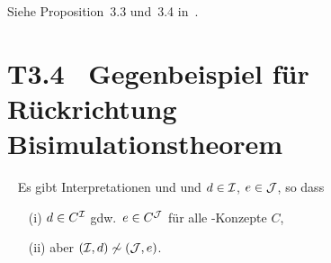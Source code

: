\documentclass[fontsize=11pt, twoside=false, numbers=autoenddot]{scrbook}
\begin{document}
\par\noindent
\begin{beweis}
  Siehe Proposition~3.3 und~3.4 in~\cite{DLintro}.
\end{beweis}

\goodbreak

\section*{T3.4~ Gegenbeispiel für Rückrichtung Bisimulationstheorem}

~
Es gibt Interpretationen \Imc und \Jmc und $d \in \mathcal{I}$, $e \in \mathcal{J}$, so dass
\begin{enumerate}
  \item[(i)]
    $d \in C^\mathcal{I}$ gdw.\ $e \in C^\mathcal{J}$ für alle \ALC-Konzepte $C$,
  \item[(ii)]
    aber $(\mathcal{I},d) \not\sim (\mathcal{J},e)$.
\end{enumerate}
\end{document}
